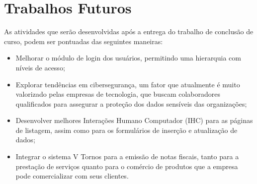 
\section{Trabalhos Futuros}
\label{cha:futuro}

As atividades que serão desenvolvidas após a entrega do trabalho de conclusão de curso, podem ser pontuadas das seguintes maneiras:

\begin{itemize}
    \item Melhorar o módulo de login dos usuários, permitindo uma hierarquia com níveis de acesso;
    
    \item Explorar tendências em cibersegurança, um fator que atualmente é muito valorizado pelas empresas de tecnologia, que buscam colaboradores qualificados para assegurar a proteção dos dados sensíveis das organizações;
    
    \item Desenvolver melhores Interações Humano Computador (IHC) para as páginas de listagem, assim como para os formulários de inserção e atualização de dados;
    
    \item Integrar o sistema V Tornos para a emissão de notas fiscais, tanto para a prestação de serviços quanto para o comércio de produtos que a empresa pode comercializar com seus clientes.
\end{itemize}